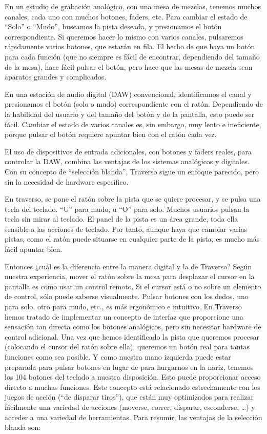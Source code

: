 En un estudio de grabación analógico, con una mesa de mezclas, tenemos muchos canales, cada uno con muchos botones, faders, etc. Para cambiar el estado de ``Solo'' o ``Mudo'', buscamos la pista deseada, y presionamos el botón correspondiente. Si queremos hacer lo mismo con varios canales, pulsaremos rápidamente varios botones, que estarán en fila. El hecho de que haya un botón para cada función (que no siempre es fácil de encontrar, dependiendo del tamaño de la mesa), hace fácil pulsar el botón, pero hace que las mesas de mezcla sean aparatos grandes y complicados.

En una estación de audio digital (DAW) convencional, identificamos el canal y presionamos el botón (solo o mudo) correspondiente con el ratón. Dependiendo de la habilidad del usuario y del tamaño del botón y de la pantalla, esto puede ser fácil. Cambiar el estado de varios canales es, sin embargo, muy lento e ineficiente, porque pulsar el botón requiere apuntar bien con el ratón cada vez.

El uso de dispositivos de entrada adicionales, con botones y faders reales, para controlar la DAW, combina las ventajas de los sistemas analógicos y digitales. Con su concepto de ``selección blanda'', Traverso sigue un enfoque parecido, pero sin la necesidad de hardware específico.

En traverso, se pone el ratón sobre la pista que se quiere procesar, y se pulsa una tecla del teclado. ``U'' para mudo, u ``O'' para solo. Muchos usuarios pulsan la tecla sin mirar al teclado. El panel de la pista es un área grande, toda ella sensible a las acciones de teclado. Por tanto, aunque haya que cambiar varias pistas, como el ratón puede situarse en cualquier parte de la pista, es mucho más fácil apuntar bien.

Entonces ¿cuál es la diferencia entre la manera digital y la de Traverso? Según nuestra experiencia, mover el ratón sobre la mesa para desplazar el cursor en la pantalla es como usar un control remoto. Si el cursor está o no sobre un elemento de control, sólo puede saberse visualmente. Pulsar botones con los dedos, uno para solo, otro para mudo, etc., es más ergonómico e intuitivo. En Traverso hemos tratado de implementar un concepto de interfaz que proporcione una sensación tan directa como los botones analógicos, pero sin necesitar hardware de control adicional. Una vez que hemos identificado la pista que queremos procesar (colocando el cursor del ratón sobre ella), queremos un botón real para tantas funciones como sea posible. Y como nuestra mano izquierda puede estar preparada para pulsar botones en lugar de para hurgarnos en la nariz, tenemos los 104 botones del teclado a nuestra disposición. Esto puede proporcionar acceso directo a muchas funciones. Este concepto está relacionado estrechamente con los juegos de acción (``de disparar tiros''), que están muy optimizados para realizar fácilmente una variedad de acciones (moverse, correr, disparar, esconderse, \dots) y acceder a una variedad de herramientas. Para resumir, las ventajas de la selección blanda son:

